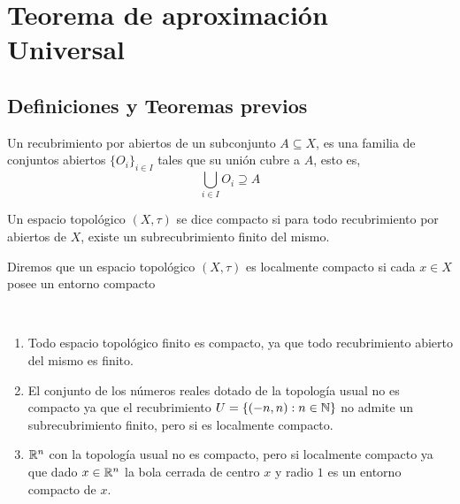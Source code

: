 \chapter{Teorema de aproximación Universal}\label{ch:TAUniversal}

\newpage 
\section{Definiciones y Teoremas previos}

    \begin{definicion}
     Un recubrimiento por abiertos de un subconjunto $A \subseteq X$, es una familia de conjuntos abiertos $\{O_i\}_{i \in I}$ tales que su unión cubre a $A$, esto es, 
     \begin{equation}
         \bigcup_{i \in I} O_i \supseteq A
     \end{equation}
    \end{definicion}

    \begin{definicion}
     Un espacio topológico $(X,\tau)$ se dice compacto si para todo recubrimiento por abiertos de $X$, existe un subrecubrimiento finito del mismo.
    \end{definicion}
    
    \begin{definicion}
     Diremos que un espacio topológico $(X,\tau)$ es localmente compacto si cada $x \in X$ posee un entorno compacto
    \end{definicion}

    \begin{ejemplo}~\smallskip
    \begin{enumerate}
        \item Todo espacio topológico finito es compacto, ya que todo recubrimiento abierto del mismo es finito.
        \item El conjunto de los números reales dotado de la topología usual no es compacto ya que el recubrimiento $U = \{(-n,n): n \in \mathbb{N}\}$ no admite un subrecubrimiento finito, pero si es localmente compacto.
        \item $\mathbb{R}^n$ con la topología usual no es compacto, pero si localmente compacto ya que dado $x\in \mathbb{R}^n$ la bola cerrada de centro $x$ y radio $1$ es un entorno compacto de $x$.
    \end{enumerate}
    \end{ejemplo}

